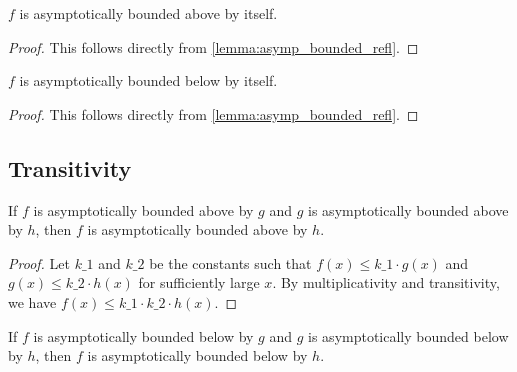 \begin{lemma}
    \label{lemma:asymp_bounded_above_refl}
    \leanok
    $f$ is asymptotically bounded above by itself.
\end{lemma}

\begin{proof}
    \leanok
    This follows directly from \ref{lemma:asymp_bounded_refl}.
\end{proof}

\begin{lemma}
    \label{lemma:asymp_bounded_below_refl}
    \leanok
    $f$ is asymptotically bounded below by itself.
\end{lemma}

\begin{proof}
    \leanok
    This follows directly from \ref{lemma:asymp_bounded_refl}.
\end{proof}


\subsection{Transitivity}

\begin{lemma}
    \label{lemma:asymp_bounded_above_trans}
    \leanok
    If $f$ is asymptotically bounded above by $g$ and $g$ is asymptotically bounded above
    by $h$, then $f$ is asymptotically bounded above by $h$.
\end{lemma}

\begin{proof}
    \leanok
    Let $k\_1$ and $k\_2$ be the constants such that $f(x) \le k\_1 \cdot g(x)$ and
    $g(x) \le k\_2 \cdot h(x)$ for sufficiently large $x$. By multiplicativity and 
    transitivity, we have $f(x) \le k\_1 \cdot k\_2 \cdot h(x)$.
\end{proof}

\begin{lemma}
    \label{lemma:asymp_bounded_below_trans}
    \leanok
    If $f$ is asymptotically bounded below by $g$ and $g$ is asymptotically bounded below
    by $h$, then $f$ is asymptotically bounded below by $h$.
\end{lemma}

